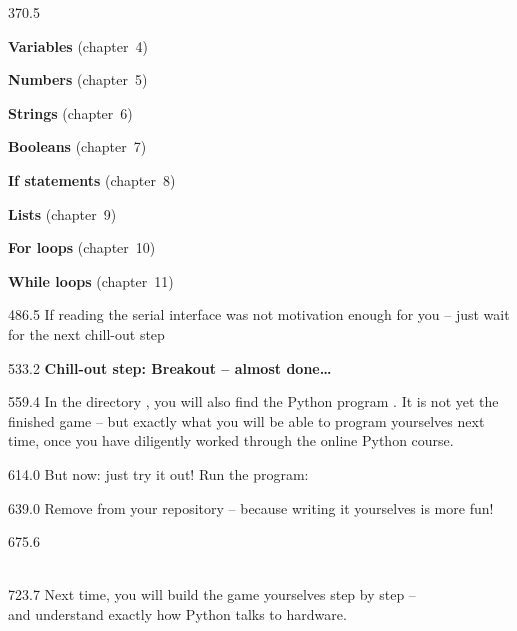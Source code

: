 \documentclass{aslab}
\begin{document}
\begin{region}[pitch=13]{370.5}
\begin{dashlist}
\item \textbf{Variables} (chapter~4)
\item \textbf{Numbers} (chapter~5)
\item \textbf{Strings} (chapter~6)
\item \textbf{Booleans} (chapter~7)
\item \textbf{If statements} (chapter~8)
\item \textbf{Lists} (chapter~9)
\item \textbf{For loops} (chapter~10)
\item \textbf{While loops} (chapter~11)
\end{dashlist}
\end{region}

\begin{region}[pitch=16.4]{486.5}
If reading the serial interface was not motivation enough for you -- just
wait for the next chill-out step\,
\end{region}

\begin{region}{533.2}
 \textbf{Chill-out step: Breakout -- almost done…}
\end{region}

\begin{region}[pitch=14.2]{559.4}
In the directory , you will also find the Python program
. It is not yet the finished game -- but exactly what you
will be able to program yourselves next time, once you have diligently
worked through the online Python course. 
\end{region}

\begin{region}{614.0}
But now: just try it out! Run the program: 
\end{region}

\begin{region}{639.0}
Remove  from your repository -- because writing it
yourselves is more fun!
\end{region}

\begin{region}{675.6}
\\
\\
\end{region}

\begin{region}{723.7}
Next time, you will build the game yourselves step by step --\\
and understand exactly how Python talks to hardware.
\end{region}
\end{document}
